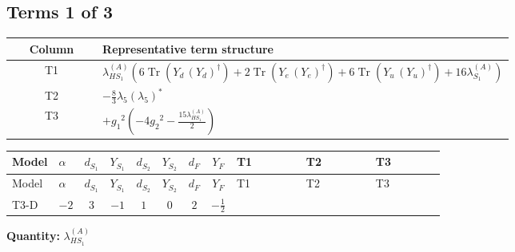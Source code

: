 \documentclass[8pt]{article}
\begin{document}
\begin{landscape}
\subsection*{Terms 1 of 3}
\begin{center}
\begin{tabular}{@{}c >{\raggedright\arraybackslash}p{0.82\linewidth}@{}}
\toprule
Column & Representative term structure \\
\midrule
T1 & \(\displaystyle {\lambda_{HS_1}^{(A)}} (6 \operatorname{Tr}\!\left({Y_d}\,\left({Y_d}\right)^{\dagger}\right)+2 \operatorname{Tr}\!\left({Y_e}\,\left({Y_e}\right)^{\dagger}\right)+6 \operatorname{Tr}\!\left({Y_u}\,\left({Y_u}\right)^{\dagger}\right)+16 {\lambda_{S_1}^{(A)}})\) \\
\midrule
T2 & \(\displaystyle -\frac{8}{3} {\lambda_5} \left({\lambda_5}\right)^{*}\) \\
\midrule
T3 & \(\displaystyle +{g_1}^2 \left(-4 {g_2}^2-\frac{15 {\lambda_{HS_1}^{(A)}}}{2}\right)\) \\
\midrule
\bottomrule
\end{tabular}
\end{center}
\smallskip
\tiny
\begin{longtable}{@{}llcccccc >{\raggedright\arraybackslash}p{0.21\linewidth} >{\raggedright\arraybackslash}p{0.21\linewidth} >{\raggedright\arraybackslash}p{0.21\linewidth}@{}}
\toprule
Model & $\alpha$ & $d_{S_1}$ & $Y_{S_1}$ & $d_{S_2}$ & $Y_{S_2}$ & $d_F$ & $Y_F$ & T1 & T2 & T3 \\
\midrule
\endfirsthead
\toprule
Model & $\alpha$ & $d_{S_1}$ & $Y_{S_1}$ & $d_{S_2}$ & $Y_{S_2}$ & $d_F$ & $Y_F$ & T1 & T2 & T3 \\
\midrule
\endhead
T3-D & $-2$ & $3$ & $-1$ & $1$ & $0$ & $2$ & $-\frac{1}{2}$ & \scriptsize\adjustbox{max width=\linewidth}{$\begin{gathered} {\lambda_{HS_1}^{(A)}} (6 \operatorname{Tr}\!\left({Y_d}\,\left({Y_d}\right)^{\dagger}\right)+2 \operatorname{Tr}\!\left({Y_e}\,\left({Y_e}\right)^{\dagger}\right)+6 \operatorname{Tr}\!\left({Y_u}\,\left({Y_u}\right)^{\dagger}\right)+16 {\lambda_{S_1}^{(A)}})\end{gathered}$} & \scriptsize\adjustbox{max width=\linewidth}{$\begin{gathered} -\frac{8}{3} {\lambda_5} \left({\lambda_5}\right)^{*}\end{gathered}$} & \scriptsize\adjustbox{max width=\linewidth}{$\begin{gathered} +{g_1}^2 \left(-4 {g_2}^2-\frac{15 {\lambda_{HS_1}^{(A)}}}{2}\right)\end{gathered}$} \\
\midrule
\bottomrule
\end{longtable}
\clearpage
\noindent\textbf{Quantity: }$\lambda_{HS_1}^{(A)}$\par\smallskip

\end{landscape}
\end{document}
